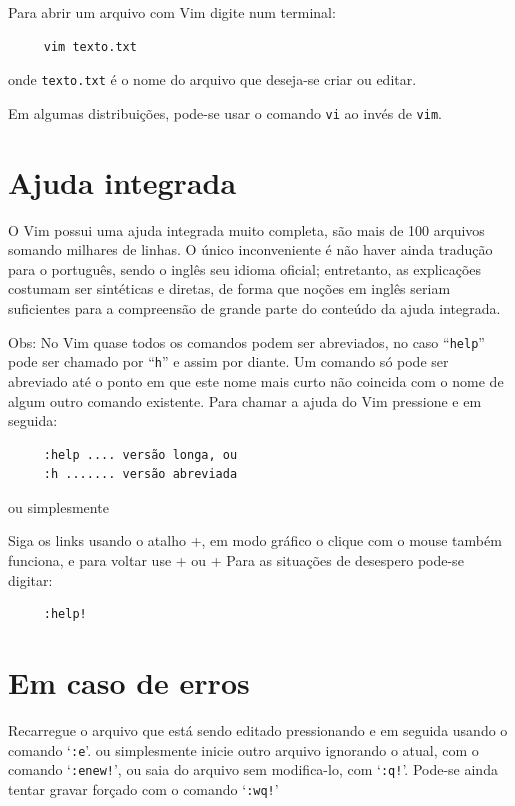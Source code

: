 Para abrir um arquivo com Vim digite num terminal:
%
\begin{verbatim}
     vim texto.txt
\end{verbatim}
onde {\tt texto.txt} é o nome do arquivo que deseja-se criar ou editar.

Em algumas distribuições, pode-se usar o comando {\tt vi} ao invés de {\tt vim}.

\section{Ajuda integrada}
%
O Vim possui uma ajuda integrada muito completa, são mais
de 100 arquivos somando milhares de linhas. O único inconveniente é não haver ainda
tradução para o português, sendo o inglês seu idioma oficial; entretanto, as explicações
costumam ser sintéticas e diretas, de forma que noções em inglês seriam
suficientes para a compreensão de grande parte do conteúdo da ajuda integrada.

Obs: No Vim quase todos os comandos podem ser abreviados, no caso
``\verb+help+'' pode ser chamado por ``\verb+h+'' e assim por diante. Um
comando só pode ser abreviado até o ponto em que este nome mais curto não
coincida com o nome de algum outro comando existente.  Para chamar a ajuda do
Vim pressione  e em seguida:
%
\begin{verbatim}
     :help .... versão longa, ou
     :h ....... versão abreviada
\end{verbatim}
%
ou simplesmente 

Siga os links usando o atalho +\key{]}, em modo gráfico o clique com o
mouse também funciona, e para voltar use + ou
+ Para as situações de desespero pode-se digitar:

\begin{verbatim}
     :help!
\end{verbatim}

\section{Em caso de erros }\label{Em caso de erros }
%
Recarregue o arquivo que está sendo editado pressionando
 e em seguida usando o comando `\texttt{:e}'.
ou simplesmente inicie outro arquivo ignorando o atual, com o comando `\texttt{:enew!}',
ou saia do arquivo sem modifica-lo, com `\texttt{:q!}'. Pode-se ainda tentar gravar
forçado com o comando `\texttt{:wq!}'

